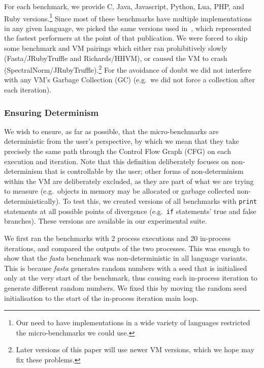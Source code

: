 \documentclass[preprint,numbers,10pt]{sigplanconf}
\newcommand{\fasta}{\emph{fasta}\xspace}
\begin{document}
For each benchmark, we provide C, Java, Javascript, Python, Lua, PHP,
and Ruby versions.\footnote{Our need to have implementations in a wide variety
of languages restricted the micro-benchmarks we could use.} Since most of these
benchmarks have multiple implementations in any given language, we picked
the same versions used in~\cite{bolz14impact}, which represented the fastest
performers at the point of that publication. We were forced to skip some
benchmark and VM pairings which either ran prohibitively slowly
(Fasta/JRubyTruffle and Richards/HHVM), or caused the VM to crash
(SpectralNorm/JRubyTruffle).\footnote{Later versions of this paper
will use newer VM versions, which we hope may fix these problems.}
For the avoidance of doubt we
did not interfere with any VM's Garbage Collection (GC) (e.g.~we did not
force a collection after each iteration).


\subsubsection{Ensuring Determinism}

We wish to ensure, as far as possible, that the micro-benchmarks are
deterministic from the user's perspective, by which we mean that they
take precisely the same path through the Control Flow Graph (CFG) on each
execution and iteration. Note that this definition deliberately focuses
on non-determinism that is controllable by the user; other forms of
non-determinism within the VM are deliberately excluded, as they are
part of what we are trying to measure (e.g.~objects in memory may be allocated
or garbage collected non-deterministically). To test this, we created
versions of all benchmarks with \texttt{print} statements at all possible points of
divergence (e.g.~\texttt{if} statements' true and false branches).
These versions are available in our experimental suite.

We first ran the benchmarks with 2 process executions and 20 in-process iterations,
and compared the outputs of the two processes. This was enough to show that the
\fasta benchmark was non-deterministic
in all language variants. This is because \fasta generates random numbers with
a seed that is initialised only at the very start of the benchmark, thus
causing each in-process iteration to generate different random numbers. We
fixed this by moving the random seed initialisation to the start
of the in-process iteration main loop.
\end{document}
